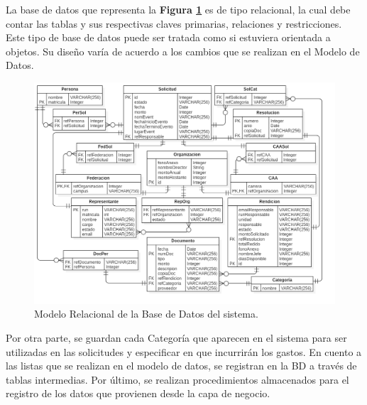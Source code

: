 La base de datos que representa la \textbf{Figura \ref{fig: Modelo_Relacional}} es de tipo relacional, la cual debe contar las tablas y sus respectivas claves primarias, relaciones y restricciones. Este tipo de base de datos puede ser tratada como si estuviera orientada a objetos. Su diseño varía de acuerdo a los cambios que se realizan en el Modelo de Datos. 

\begin{figure}[htb]
    \includegraphics[width=\textwidth]{Imagenes/Modelo_relacional_bd.png}
    \caption{\label{fig: Modelo_Relacional}Modelo Relacional de la Base de Datos del sistema.}
\end{figure}

Por otra parte, se guardan cada Categoría que aparecen en el sistema para ser utilizadas en las solicitudes y especificar en que incurrirán los gastos. En cuento a las listas que se realizan en el modelo de datos, se registran en la BD a través de tablas intermedias. Por último, se realizan procedimientos almacenados para el registro de los datos que provienen desde la capa de negocio. 

